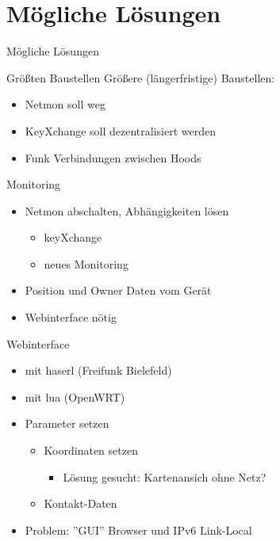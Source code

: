 \section{Mögliche Lösungen}
\begin{frame}{}
    \begin{center}
        Mögliche Lösungen
     \end{center}
\end{frame}

\begin{frame}{Größten Baustellen}
    Größere (längerfristige) Baustellen:
    \begin{itemize}
        \item Netmon soll weg
        \item KeyXchange soll dezentralisiert werden
        \item Funk Verbindungen zwischen Hoods
    \end{itemize}
\end{frame}

\begin{frame}{Monitoring}
    \begin{itemize}
        \item Netmon abschalten, Abhängigkeiten lösen
        \begin{itemize}
            \item keyXchange
            \item neues Monitoring
        \end{itemize}
        \item Position und Owner Daten vom Gerät
        \item Webinterface nötig
    \end{itemize}
\end{frame}

\begin{frame}{Webinterface}
    \begin{itemize}
        \item \zb{} mit haserl (Freifunk Bielefeld)
        \item \zb{} mit lua (OpenWRT)
        \item Parameter setzen
        \begin{itemize}
            \item Koordinaten setzen
                \begin{itemize}
                    \item Lösung gesucht: Kartenansich ohne Netz?
                \end{itemize}
            \item Kontakt-Daten
        \end{itemize}
        \item Problem: ''GUI'' Browser und IPv6 Link-Local
    \end{itemize}
\end{frame}

